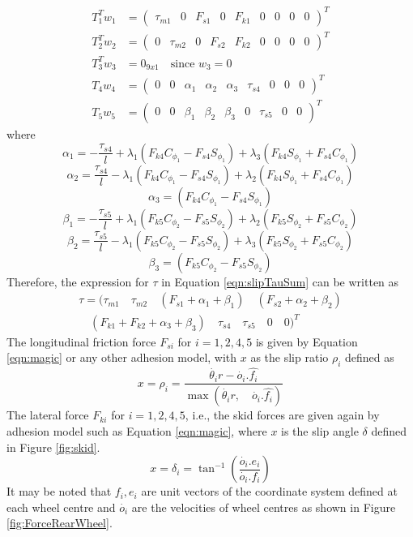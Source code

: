 {\begin{subequations}
	\label{eqn:slip_Tau_is}
	\begin{align}
	T_1^T w_1&=\begin{pmatrix}
	\tau_{m1} & 0 & F_{s1}& 0& F_{k1}&0&0&0&0
	\end{pmatrix} ^T\\
	T_2^T w_2&=\begin{pmatrix}
	0&\tau_{m2}& 0&F_{s2}&  F_{k2}&0&0&0&0
	\end{pmatrix} ^T\\
	T_3^T w_3&=0_{9x1} \quad \text{since } w_3=0\\
	T_4w_4&= \begin{pmatrix}
	0 & 0& \alpha_1& \alpha_2 & \alpha_3 &\tau_{s4}& 0&0 &0
	\end{pmatrix}^T\\
	T_5w_5&=\begin{pmatrix}
	0 & 0& \beta_1& \beta_2 & \beta_3 &0 &\tau_{s5}& 0&0
	\end{pmatrix}^T
	\end{align}
\end{subequations}
where 
\[\alpha_1=-\frac{\tau_{s4}}{l}+\lambda_1(F_{k4}C_{\phi_1}-F_{s4}S_{\phi_1})+\lambda_3(F_{k4}S_{\phi_1}+F_{s4}C_{\phi_1})\]
\[\alpha_2=\frac{\tau_{s4}}{l}-\lambda_1(F_{k4}C_{\phi_1}-F_{s4}S_{\phi_1})+\lambda_2(F_{k4}S_{\phi_1}+F_{s4}C_{\phi_1})\]
\[\alpha_3=(F_{k4}C_{\phi_1}-F_{s4}S_{\phi_1})\]
\[\beta_1=-\frac{\tau_{s5}}{l}+\lambda_1(F_{k5}C_{\phi_2}-F_{s5}S_{\phi_2})+\lambda_2(F_{k5}S_{\phi_2}+F_{s5}C_{\phi_2})\]
\[\beta_2=\frac{\tau_{s5}}{l}-\lambda_1(F_{k5}C_{\phi_2}-F_{s5}S_{\phi_2})+\lambda_3(F_{k5}S_{\phi_2}+F_{s5}C_{\phi_2})\]
\[\beta_3=(F_{k5}C_{\phi_2}-F_{s5}S_{\phi_2})\]
Therefore, the expression for  $\tau$ in  Equation \ref{eqn:slipTauSum} can be written as
\begin{multline}
\tau=(
\tau_{m1} \quad \tau_{m2} \quad (F_{s1}+\alpha_1+\beta_1) \quad( F_{s2}+\alpha_2+\beta_2) \\
 \quad  (F_{k1}+ F_{k2}+\alpha_3+\beta_3)\quad \tau_{s4}\quad  \tau_{s5} \quad 0 \quad 0 )  ^T
\end{multline}
The longitudinal  friction force $F_{si}$ for $i=1,2,4,5 $ is given by Equation \ref{eqn:magic} or any other adhesion model, with $ x $ as the slip ratio $\rho_i$ defined as
\[
x = \rho_i = \frac{\dot{\theta_i} r - \dot{o_i}.\hat{f_i}}{\max(\dot{\theta_i} r,\quad \dot{o_i}.\hat{f_i})}
\]
The lateral force  $F_{ki}$ for $i=1,2,4,5 $, i.e., the skid forces are given again by adhesion model such as Equation \ref{eqn:magic},  where $x$ is the slip angle $\delta$ defined in Figure \ref{fig:skid}. 
\[
x = \delta_i=\tan^{-1}(\frac{\dot{o_i}.e_i}{\dot{o_i}.f_i})
\]
It may be noted that $f_i,e_i$ are unit vectors of the coordinate system defined at each wheel centre and $\dot{o_i}$ are the velocities of wheel centres as shown in Figure  \ref{fig:ForceRearWheel}.
}
